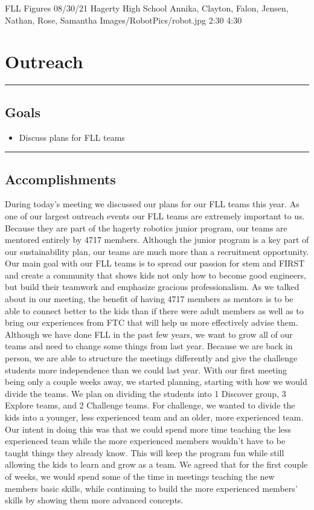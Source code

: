 \insertmeeting 
	{FLL Figures} 
	{08/30/21}
	{Hagerty High School}
	{Annika, Clayton, Falon, Jensen, Nathan, Rose, Samantha}
	{Images/RobotPics/robot.jpg}
	{2:30}
  	{4:30}
	
\section*{Outreach}
\noindent\hfil\rule{\textwidth}{.4pt}\hfil
\subsection*{Goals}
\begin{itemize}
    \item Discuss plans for FLL teams
\end{itemize} 

\noindent\hfil\rule{\textwidth}{.4pt}\hfil

\subsection*{Accomplishments}
During today’s meeting we discussed our plans for our FLL teams this year. As one of our largest outreach events our FLL teams are extremely important to us. Because they are part of the hagerty robotics junior program, our teams are mentored entirely by 4717 members. Although the junior program is a key part of our sustainability plan, our teams are much more than a recruitment opportunity. Our main goal with our FLL teams is to spread our passion for stem and FIRST and create a community that shows kids not only how to become good engineers, but build their teamwork and emphasize gracious professionalism. As we talked about in our meeting, the benefit of having 4717 members as mentors is to be able to connect better to the kids than if there were adult members as well as to bring our experiences from FTC that will help us more effectively advise them.
Although we have done FLL in the past few years, we want to grow all of our teams and need to change some things from last year. Because we are back in person, we are able to structure the meetings differently and give the challenge students more independence than we could last year. With our first meeting being only a couple weeks away, we started planning, starting with how we would divide the teams. We plan on dividing the students into 1 Discover group, 3 Explore teams, and 2 Challenge teams. For challenge, we wanted to divide the kids into a younger, less experienced team and an older, more experienced team. Our intent in doing this was that we could spend more time teaching the less experienced team while the more experienced members wouldn't have to be taught things they already know. This will keep the program fun while still allowing the kids to learn and grow as a team. We agreed that for the first couple of weeks, we would spend some of the time in meetings teaching the new members basic skills, while continuing to build the more experienced members’ skills by showing them more advanced concepts.
